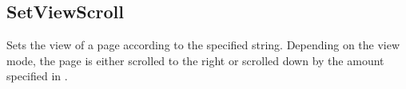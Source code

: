 \documentclass[letterpaper,12pt,english,openany,oneside]{sphinxmanual}
\begin{document}
\subsection{SetViewScroll}
\label{\detokenize{IAC_API_OLE_Objects:setviewscroll}}
Sets the view of a page according to the specified string. Depending on the view mode, the page is either scrolled to the right or scrolled down by the amount specified in .


\begin{sphinxVerbatim}[commandchars=\\\{\}]
    
\end{sphinxVerbatim}
\label{\detokenize{IAC_API_OLE_Objects:parameters-93}}
\end{document}
